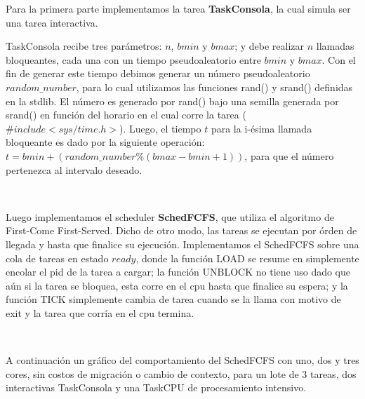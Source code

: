 Para la primera parte implementamos la tarea \textbf{TaskConsola}, la cual simula ser una tarea interactiva.

TaskConsola recibe tres parámetros: $n$, $bmin$ y $bmax$; y debe realizar $n$ llamadas bloqueantes, cada una con un tiempo pseudoaleatorio
entre $bmin$ y $bmax$. Con el fin de generar este tiempo debimos generar un número pseudoaleatorio $random\_number$, para lo cual utilizamos las funciones rand() y srand() definidas en la stdlib. El número es generado por rand() bajo una semilla generada por srand() en función del horario en el cual corre la tarea ($\#include <sys/time.h>$). Luego, el tiempo $t$ para la i-ésima llamada bloqueante es dado por la siguiente operación: $t = bmin + (random\_number \% (bmax-bmin+1))$, para que el número pertenezca al intervalo deseado.

~

Luego implementamos el scheduler \textbf{SchedFCFS}, que utiliza el algoritmo de First-Come First-Served. Dicho de otro modo, las tareas se ejecutan por órden de llegada y hasta que finalice su ejecución. Implementamos el SchedFCFS sobre una cola de tareas en estado $ready$, donde la función LOAD se resume en simplemente encolar el pid de la tarea a cargar; la función UNBLOCK no tiene uso dado que aún si la tarea se bloquea, esta corre en el cpu hasta que finalice su espera; y la función TICK simplemente cambia de tarea cuando se la llama con motivo de exit y la tarea que corría en el cpu termina.

~

A continuación un gráfico del comportamiento del SchedFCFS con uno, dos y tres cores, sin costos de migración o cambio de contexto, para un lote de 3 tareas, dos interactivas TaskConsola y una TaskCPU de procesamiento intensivo.


